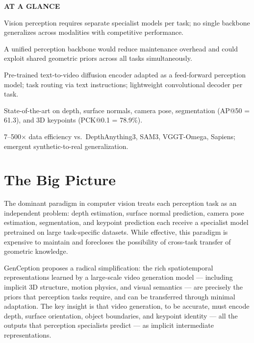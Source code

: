 \documentclass[10pt,twocolumn]{article}
\begin{document}
\begin{mdframed}[backgroundcolor=boxgray,linecolor=rulered,linewidth=1pt,
    innerleftmargin=6pt,innerrightmargin=6pt,
    innertopmargin=6pt,innerbottommargin=6pt]
\textbf{\small AT A GLANCE}\par\vspace{4pt}
\begin{description}[leftmargin=0pt,labelsep=4pt,itemsep=2pt,parsep=0pt,
    font=\small\bfseries]
  \item[Problem:] Vision perception requires separate specialist models
    per task; no single backbone generalizes across modalities with
    competitive performance.
  \item[Why it matters:] A unified perception backbone would reduce
    maintenance overhead and could exploit shared geometric priors
    across all tasks simultaneously.
  \item[Method:] Pre-trained text-to-video diffusion encoder adapted
    as a feed-forward perception model; task routing via text instructions;
    lightweight convolutional decoder per task.
  \item[Result:] State-of-the-art on depth, surface normals, camera
    pose, segmentation (AP@50 = 61.3), and 3D keypoints (PCK@0.1
    = 78.9\%).
  \item[Evidence:] 7--500$\times$ data efficiency vs.\ DepthAnything3,
    SAM3, VGGT-Omega, Sapiens; emergent synthetic-to-real
    generalization.
\end{description}
\end{mdframed}

\section{The Big Picture}

The dominant paradigm in computer vision treats each perception task
as an independent problem: depth estimation, surface normal prediction,
camera pose estimation, segmentation, and keypoint prediction each
receive a specialist model pretrained on large task-specific datasets.
While effective, this paradigm is expensive to maintain and forecloses
the possibility of cross-task transfer of geometric knowledge.

GenCeption proposes a radical simplification: the rich spatiotemporal
representations learned by a large-scale video generation model ---
including implicit 3D structure, motion physics, and visual semantics
--- are precisely the priors that perception tasks require, and can
be transferred through minimal adaptation.
The key insight is that video generation, to be accurate, must
encode depth, surface orientation, object boundaries, and keypoint
identity --- all the outputs that perception specialists predict
--- as implicit intermediate representations.
\end{document}
